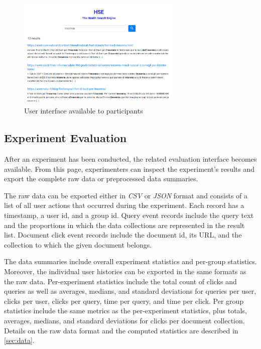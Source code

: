 \documentclass[a4paper]{usiinfbachelorproject}
\begin{document}
\begin{figure} [h]
\centering
\includegraphics[width=0.7\textwidth]{figures/searchUi}
\caption{User interface available to participants}
\label{fig:searchUi}
\end{figure}

\subsection{\textbf{Experiment Evaluation}} \label{sec:designExpEval}

After an experiment has been conducted, the  related evaluation interface becomes available. From this page,
experimenters can inspect the experiment's results and export  the complete raw data
or preprocessed data summaries.

The raw data can be exported either in \emph{CSV} or \emph{JSON} format and consists of a list of all user actions that occurred during the experiment. 
Each record has a timestamp, a user id, and a group id. Query event records include the query text and the proportions in which
the data collections are represented  in the result list. Document click event records include the document id, its URL, and
the collection to which the given document belongs.

The data summaries include overall experiment statistics and per-group statistics. Moreover, the individual user histories can be 
exported in the same formats as the raw data.
Per-experiment statistics include the total count of clicks and queries as well as averages, medians, and standard deviations
for queries per user, clicks per user, clicks per query, time per query, and time per click.
Per group statistics include the same metrics as the per-experiment statistics, plus totals, averages, medians, and standard deviations
for clicks per document collection. Details on the raw data format and the computed statistics are described in \ref{sec:data}.
\end{document}
